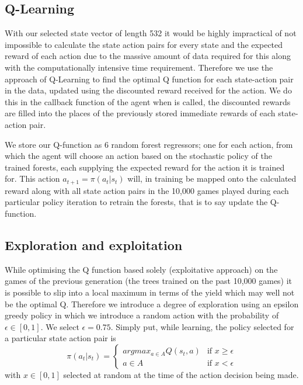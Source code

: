 	\subsection{Q-Learning}
	With our selected state vector of length 532 it would be highly impractical of not impossible to calculate the state action pairs for every state and the expected reward of each action due to the massive amount of data required for this along with the computationally intensive time requirement. Therefore we use the approach of Q-Learning to find the optimal Q function for each state-action pair in the data, updated using the discounted reward received for the action. We do this in the callback function of the agent when  is called, the discounted rewards are filled into the places of the previously stored immediate rewards of each state-action pair. 
	
	We store our Q-function as 6 random forest regressors; one for each action, from which the agent will choose an action based on the stochastic policy of the trained forests, each supplying the expected reward for the action it is trained for. This action $a_{t+1} = \pi(a_t|s_t)$ will, in training be mapped onto the calculated reward along with all state action pairs in the 10,000 games played during each particular policy iteration to retrain the forests, that is to say update the Q-function.
	
	\subsection{Exploration and exploitation}
	\label{explo}
	While optimising the Q function based solely (exploitative approach) on the games of the previous generation (the trees trained on the past 10,000 games) it is possible to slip into a local maximum in terms of the yield which may well not be the optimal Q. Therefore we introduce a degree of exploration using an epsilon greedy policy in which we introduce a random action with the probability of $\epsilon \in [0,1]$. We select $\epsilon = 0.75$. Simply put, while learning, the policy selected for a particular state action pair is 
	$$\pi(a_t|s_t) = \left\{
		\begin{array}{ll}
			argmax_{a \in A}Q(s_t,a)  & \mbox{if } x \geq \epsilon \\
			a \in A & \mbox{if } x < \epsilon
		\end{array}
	\right.$$
	with $x \in [0,1]$ selected at random at the time of the action decision being made.
	
